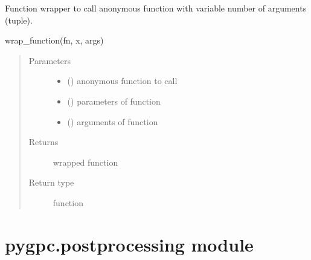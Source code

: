 \documentclass[letterpaper,10pt,english,openany,oneside]{sphinxmanual}
\begin{document}

\begin{fulllineitems}
\label{\detokenize{pygpc:pygpc.misc.wrap_function}}
Function wrapper to call anonymous function with variable number of arguments (tuple).

wrap\_function(fn, x, args)
\begin{quote}\begin{description}
\item[{Parameters}] \leavevmode\begin{itemize}
\item {} 
 () \textendash{} anonymous function to call

\item {} 
 () \textendash{} parameters of function

\item {} 
 () \textendash{} arguments of function

\end{itemize}

\item[{Returns}] \leavevmode
{} \textendash{} wrapped function

\item[{Return type}] \leavevmode
function

\end{description}\end{quote}

\end{fulllineitems}



\section{pygpc.postprocessing module}
\label{\detokenize{pygpc:module-pygpc.postprocessing}}\label{\detokenize{pygpc:pygpc-postprocessing-module}}
\end{document}
